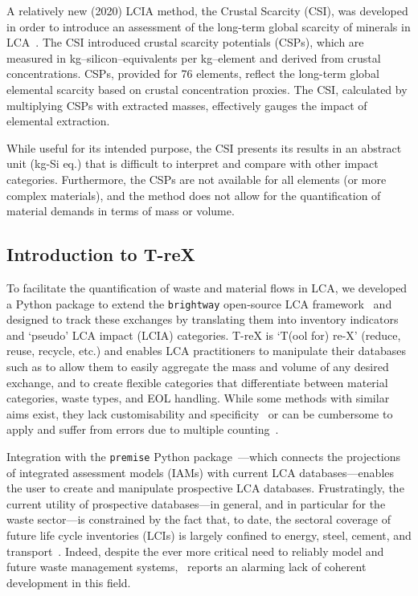 A relatively new (2020) LCIA method, the Crustal Scarcity (CSI), was developed in order to introduce an assessment of the long-term global scarcity of minerals in LCA~\citep{arvidsson2020csi}. The CSI introduced crustal scarcity potentials (CSPs), which are measured in kg--silicon--equivalents per kg--element and derived from crustal concentrations. CSPs, provided for 76 elements, reflect the long-term global elemental scarcity based on crustal concentration proxies. The CSI, calculated by multiplying CSPs with extracted masses, effectively gauges the impact of elemental extraction.

While useful for its intended purpose, the CSI presents its results in an abstract unit (kg-Si eq.) that is difficult to interpret and compare with other impact categories. Furthermore, the CSPs are not available for all elements (or more complex materials), and the method does not allow for the quantification of material demands in terms of mass or volume.

\subsection{Introduction to T-reX}\label{sec:intro-trex}

To facilitate the quantification of waste and material flows in LCA, we developed a Python package to extend the \texttt{brightway} open-source LCA framework~\citep{mutel2017brightway} and designed to track these exchanges by translating them into inventory indicators and `pseudo' LCA impact (LCIA) categories. T-reX is `T(ool for) re-X' (reduce, reuse, recycle, etc.) and enables LCA practitioners to manipulate their databases such as to allow them to easily aggregate the mass and volume of any desired exchange, and to create flexible categories that differentiate between material categories, waste types, and EOL handling. While some methods with similar aims exist, they lack customisability and specificity~\citep{foen2021ecofactors} or can be cumbersome to apply and suffer from errors due to multiple counting~\citep{laurenti2023wastefootprint}.

Integration with the \texttt{premise} Python package~\citep{sacchi2022premise}---which connects the projections of integrated assessment models (IAMs) with current LCA databases---enables the user to create and manipulate prospective LCA databases. Frustratingly, the current utility of prospective databases---in general, and in particular for the waste sector---is constrained by the fact that, to date, the sectoral coverage of future life cycle inventories (LCIs) is largely confined to energy, steel, cement, and transport~\citep{sacchi2023premisedocs}. Indeed, despite the ever more critical need to reliably model and future waste management systems,~\cite{bisinella2024wastelca} reports an alarming lack of coherent development in this field.

